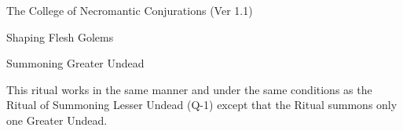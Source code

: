 \begin{Chapter}{The College of Necromantic Conjurations (Ver 1.1)}
\begin{ritual}[R-4]{Shaping Flesh Golems}
\begin{effects}
\end{effects}
\end{ritual}

\begin{ritual}[R-5]{Summoning Greater Undead}

\begin{effects}
This ritual works in the same manner and under the same conditions as
the Ritual of Summoning Lesser Undead (Q-1) except that the Ritual
summons only one Greater Undead.
\end{effects}
\end{ritual}

\end{Chapter}
